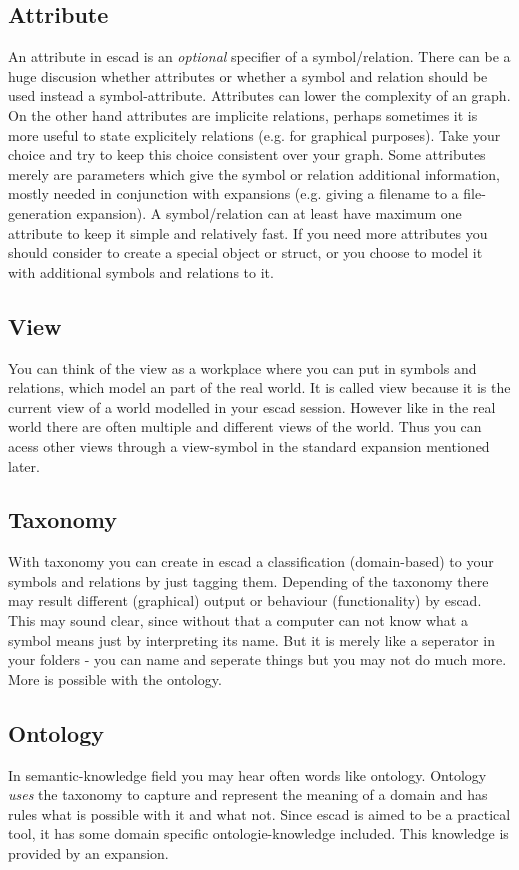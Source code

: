 \documentclass[a4paper, 12pt, openany]{scrbook}
\begin{document}
\subsection{Attribute}
An attribute in escad is an \emph{optional} specifier of a symbol/relation. There can be a huge discusion whether attributes or whether a symbol and relation should be used instead a symbol-attribute. Attributes can lower the complexity of an graph. On the other hand attributes are implicite relations, perhaps sometimes it is more useful to state explicitely relations (e.g. for graphical purposes). Take your choice and try to keep this choice consistent over your graph. Some attributes merely are parameters which give the symbol or relation additional information, mostly needed in conjunction with expansions (e.g. giving a filename to a file-generation expansion). A symbol/relation can at least have maximum one attribute to keep it simple and relatively fast. If you need more attributes you should consider to create a special object or struct, or you choose to model it with additional symbols and relations to it.
\subsection{View}
You can think of the view as a workplace where you can put in symbols and relations, which model an part of the real world. It is called view because it is the current view of a world modelled in your escad session. However like in the real world there are often multiple and different views of the world. Thus you can acess other views through a view-symbol in the standard expansion mentioned later.
\subsection{Taxonomy}
With taxonomy you can create in escad a classification (domain-based) to your symbols and relations by just tagging them. Depending of the taxonomy there may result different (graphical) output or behaviour (functionality) by escad. This may sound clear, since without that a computer can not know what a symbol means just by interpreting its name. But it is merely like a seperator in your folders - you can name and seperate things but you may not do much more. More is possible with the ontology.
\subsection{Ontology}
In semantic-knowledge field you may hear often words like ontology. Ontology \emph{uses} the taxonomy to capture and represent the meaning of a domain and has rules what is possible with it and what not. Since escad is aimed to be a practical tool, it has some domain specific ontologie-knowledge included. This knowledge is provided by an expansion.
\end{document}
